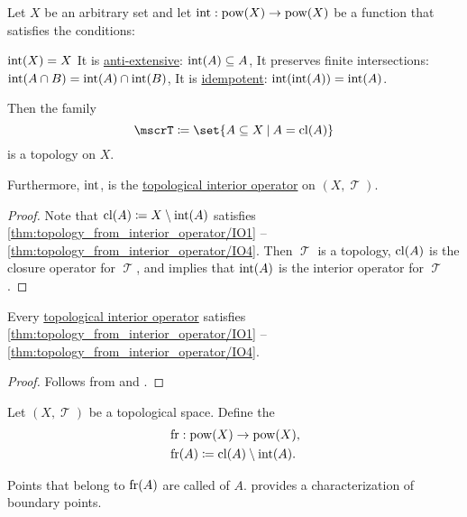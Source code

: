 \begin{proposition}\label{thm:topology_from_interior_operator}
  Let \( X \) be an arbitrary set and let \( \operatorname{int}: \operatorname{pow}(X) \to \operatorname{pow}(X) \) be a function that satisfies the conditions:
  \begin{thmenum}
     \( \operatorname{int}(X) = X \)
     It is \hyperref[def:extensive_function]{anti-extensive}: \( \operatorname{int}(A) \subseteq A \),
     It preserves finite intersections: \( \operatorname{int}(A \cap B) = \operatorname{int}(A) \cap \operatorname{int}(B) \),
     It is \hyperref[def:magma/idempotent]{idempotent}: \( \operatorname{int}(\operatorname{int}(A)) = \operatorname{int}(A) \).
  \end{thmenum}

  Then the family
  \begin{equation*}
    \mscrT \coloneqq \set{ A \subseteq X \given A = \cl(A) }
  \end{equation*}
  is a topology on \( X \).

  Furthermore, \( \operatorname{int} \), is the \hyperref[def:topological_interior_operator]{topological interior operator} on \( (X, \mscrT) \).
\end{proposition}
\begin{proof}
  Note that \( \operatorname{cl}(A) \coloneqq X \setminus \operatorname{int}(A) \) satisfies \ref{thm:topology_from_interior_operator/IO1} -- \ref{thm:topology_from_interior_operator/IO4}. Then \( \mscrT \) is a topology, \( \operatorname{cl}(A) \) is the closure operator for \( \mscrT \), and  implies that \( \operatorname{int}(A) \) is the interior operator for \( \mscrT \).
\end{proof}

\begin{proposition}\label{thm:topological_interior_operator_can_generate_topology}
  Every \hyperref[def:topological_interior_operator]{topological interior operator} satisfies \ref{thm:topology_from_interior_operator/IO1} -- \ref{thm:topology_from_interior_operator/IO4}.
\end{proposition}
\begin{proof}
  Follows from  and .
\end{proof}

\begin{definition}\label{def:topological_boundary_operator}
  Let \( (X, \mscrT) \) be a topological space. Define the 
  \begin{equation*}
    \begin{aligned}
      &\operatorname{fr}: \operatorname{pow}(X) \to \operatorname{pow}(X), \\
      &\operatorname{fr}(A) \coloneqq \operatorname{cl}(A) \setminus \operatorname{int}(A).
    \end{aligned}
  \end{equation*}

  Points that belong to \( \operatorname{fr}(A) \) are called  of \( A \).  provides a characterization of boundary points.
\end{definition}

